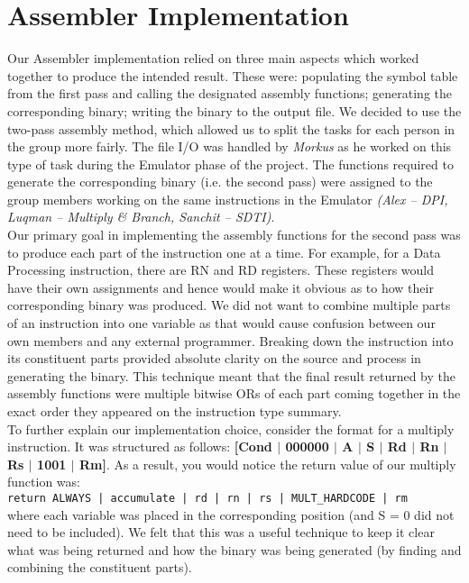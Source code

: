\documentclass[10pt]{article}
\begin{document}
\section*{Assembler Implementation}

Our Assembler implementation relied on three main aspects which worked together to produce the intended result. These were: populating the symbol table from the first pass and calling the designated assembly functions; generating the corresponding binary; writing the binary to the output file. We decided to use the two-pass assembly method, which allowed us to split the tasks for each person in the group more fairly. The file I/O was handled by {\sl Morkus} as he worked on this type of task during the Emulator phase of the project. The functions required to generate the corresponding binary (i.e. the second pass) were assigned to the group members working on the same instructions in the Emulator {\sl(Alex – DPI, Luqman – Multiply \& Branch, Sanchit – SDTI)}. 
\\

Our primary goal in implementing the assembly functions for the second pass was to produce each part of the instruction one at a time. For example, for a Data Processing instruction, there are RN and RD registers. These registers would have their own assignments and hence would make it obvious as to how their corresponding binary was produced. We did not want to combine multiple parts of an instruction into one variable as that would cause confusion between our own members and any external programmer. Breaking down the instruction into its constituent parts provided absolute clarity on the source and process in generating the binary. This technique meant that the final result returned by the assembly functions were multiple bitwise ORs of each part coming together in the exact order they appeared on the instruction type summary.
\\

To further explain our implementation choice, consider the format for a multiply instruction. It was structured as follows: \textbf{[Cond $|$ 000000 $|$ A $|$ S $|$ Rd $|$ Rn $|$ Rs $|$ 1001 $|$ Rm]}. As a result, you would notice the return value of our multiply function was:
\\

{\tt return ALWAYS | accumulate | rd | rn | rs | MULT\_HARDCODE | rm}
\\

where each variable was placed in the corresponding position (and S = 0 did not need to be included). We felt that this was a useful technique to keep it clear what was being returned and how the binary was being generated (by finding and combining the constituent parts).
\\
\end{document}
